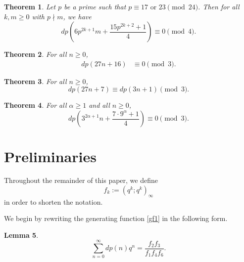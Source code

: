 \documentclass[10pt,a4paper]{amsart}
\newtheorem{theorem}{Theorem}[section]
\newtheorem{lemma}[theorem]{Lemma}
\begin{document}
\begin{theorem} Let $p$ be a prime such that $p \equiv 17 \mbox{ or } 23 \pmod{24}$. Then for all $k,m \geq 0$ with $p \nmid m$, we have
\begin{equation*}
dp\left( 6p^{2k+1}m + \frac{15p^{2k+2}+1}{4} \right) \equiv 0 \pmod{4}.
\end{equation*}
\label{Th2}
\end{theorem}

\begin{theorem}
For all $n \geq 0$,
\begin{align}
dp(27n+16) & \equiv 0 \pmod{3}.
\label{c2}
\end{align}
\label{Th3}
\end{theorem}

\begin{theorem}
For all $n \geq 0$,
\begin{equation*}
dp(27n+7) \equiv dp(3n+1) \pmod{3}.
\end{equation*}
\label{internal_cong}
\end{theorem}

\begin{theorem}
For all $\alpha \geq 1$ and all $n \geq  0$,
\begin{equation*}
    dp \left( 3^{2\alpha + 1}n + \frac{7 \cdot 9^\alpha + 1}{4} \right) \equiv 0 \pmod{3}.
\end{equation*}
\label{Th4}
\end{theorem}

	







\section{Preliminaries}

Throughout the remainder of this paper, we define 
		$$f_k := (q^k;q^k)_{\infty}$$
in order to shorten the notation.

We begin by rewriting the generating function \eqref{gf1} in the following form.


\begin{lemma}
\begin{equation}
\sum_{n=0}^{\infty} dp(n)q^n = \frac{f_2f_3}{f_1f_4f_6}.
\label{gf2}
\end{equation}
\end{lemma}
\end{document}
